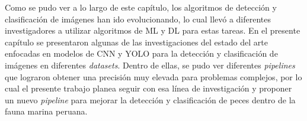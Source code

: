 Como se pudo ver a lo largo de este capítulo, los algoritmos de detección y clasificación de 
imágenes han ido evolucionando, lo cual llevó a diferentes investigadores a utilizar algoritmos de ML y DL para estas tareas. En el 
presente capítulo se presentaron algunas de las investigaciones del estado del arte enfocadas en modelos de CNN y 
YOLO para la detección y clasificación de imágenes en diferentes \textit{datasets}. Dentro de ellas, se pudo ver 
diferentes \textit{pipelines} que lograron obtener una precisión muy elevada para problemas complejos, por lo cual el 
presente trabajo planea seguir con esa línea de investigación y proponer un nuevo \textit{pipeline} para mejorar la detección y 
clasificación de peces dentro de la fauna marina peruana.   
